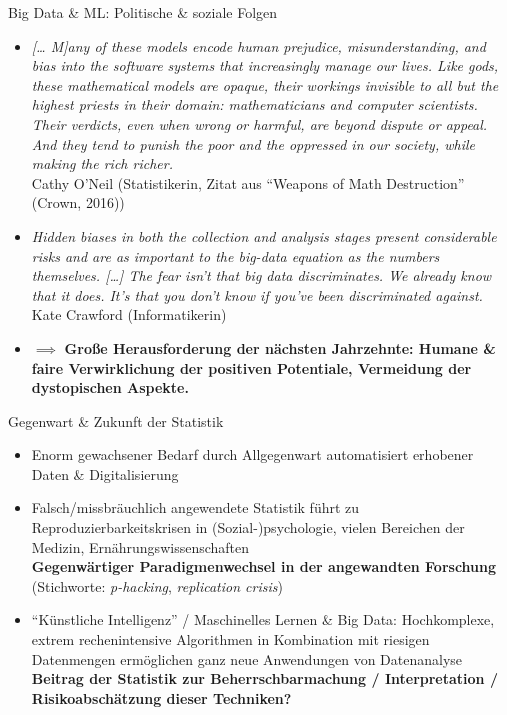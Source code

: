 \documentclass[
  10pt,
  ignorenonframetext,
]{beamer}
\providecommand{\tightlist}{%
  \setlength{\itemsep}{0pt}\setlength{\parskip}{0pt}}
\begin{document}
\begin{frame}{Big Data \& ML: Politische \& soziale Folgen}
\label{big-data-ml-politische-soziale-folgen-2}
\begin{itemize}[<+->]
\tightlist
\item
  \emph{{[}\ldots{} M{]}any of these models encode human prejudice,
  misunderstanding, and bias into the software systems that increasingly
  manage our lives. Like gods, these mathematical models are opaque,
  their workings invisible to all but the highest priests in their
  domain: mathematicians and computer scientists. Their verdicts, even
  when wrong or harmful, are beyond dispute or appeal. And they tend to
  punish the poor and the oppressed in our society, while making the
  rich richer.}\\
  Cathy O'Neil (Statistikerin, Zitat aus ``Weapons of Math Destruction''
  (Crown, 2016))
\end{itemize}

\begin{itemize}[<+->]
\tightlist
\item
  \emph{Hidden biases in both the collection and analysis stages present
  considerable risks and are as important to the big-data equation as
  the numbers themselves. {[}\ldots{]} The fear isn't that big data
  discriminates. We already know that it does. It's that you don't know
  if you've been discriminated against.}\\
  Kate Crawford (Informatikerin)
\end{itemize}

\begin{itemize}[<+->]
\tightlist
\item
  \(\implies\) \textbf{Große Herausforderung der nächsten Jahrzehnte:
  Humane \& faire Verwirklichung der positiven Potentiale, Vermeidung
  der dystopischen Aspekte.}
\end{itemize}
\end{frame}

\begin{frame}{Gegenwart \& Zukunft der Statistik}
\label{gegenwart-zukunft-der-statistik-1}
\begin{itemize}
\item
  Enorm gewachsener Bedarf durch Allgegenwart automatisiert erhobener
  Daten \& Digitalisierung
\item
  Falsch/missbräuchlich angewendete Statistik führt zu
  Reproduzierbarkeitskrisen in (Sozial-)psychologie, vielen Bereichen
  der Medizin, Ernährungswissenschaften\\
  \textbf{Gegenwärtiger Paradigmenwechsel in der angewandten
  Forschung}\\
  (Stichworte: \emph{p-hacking}, \emph{replication crisis})
\item
  ``Künstliche Intelligenz'' / Maschinelles Lernen \& Big Data:
  Hochkomplexe, extrem rechenintensive Algorithmen in Kombination mit
  riesigen Datenmengen ermöglichen ganz neue Anwendungen von
  Datenanalyse\\
  \textbf{Beitrag der Statistik zur Beherrschbarmachung / Interpretation
  / Risikoabschätzung dieser Techniken?}
\end{itemize}
\end{frame}
\end{document}
